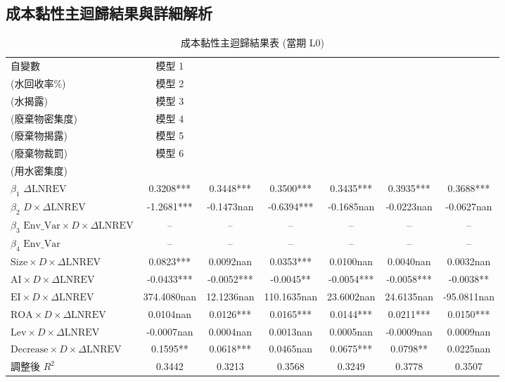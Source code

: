 \documentclass[12pt,a4paper]{article}
\begin{document}
\subsection{成本黏性主迴歸結果與詳細解析}

\begin{table}[H]
\centering
\caption{成本黏性主迴歸結果表 (當期 L0)}
\label{tab:main_reg}
\begin{threeparttable}
\scriptsize
\begin{tabular}{lcccccc}
\toprule
自變數 & 模型 1\\(水回收率\%) & 模型 2\\(水揭露) & 模型 3\\(廢棄物密集度) & 模型 4\\(廢棄物揭露) & 模型 5\\(廢棄物裁罰) & 模型 6\\(用水密集度) \\
\midrule
$\beta_1$ $\Delta\text{LNREV}$ & 0.3208*** & 0.3448*** & 0.3500*** & 0.3435*** & 0.3935*** & 0.3688*** \\
$\beta_2$ $D \times \Delta\text{LNREV}$ & -1.2681*** & -0.1473nan & -0.6394*** & -0.1685nan & -0.0223nan & -0.0627nan \\
$\beta_3$ $\text{Env\_Var} \times D \times \Delta\text{LNREV}$ & -- & -- & -- & -- & -- & -- \\
$\beta_4$ $\text{Env\_Var}$ & -- & -- & -- & -- & -- & -- \\
 $\text{Size} \times D \times \Delta\text{LNREV}$ & 0.0823*** & 0.0092nan & 0.0353*** & 0.0100nan & 0.0040nan & 0.0032nan \\
 $\text{AI} \times D \times \Delta\text{LNREV}$ & -0.0433*** & -0.0052*** & -0.0045** & -0.0054*** & -0.0058*** & -0.0038** \\
 $\text{EI} \times D \times \Delta\text{LNREV}$ & 374.4080nan & 12.1236nan & 110.1635nan & 23.6002nan & 24.6135nan & -95.0811nan \\
 $\text{ROA} \times D \times \Delta\text{LNREV}$ & 0.0104nan & 0.0126*** & 0.0165*** & 0.0144*** & 0.0211*** & 0.0150*** \\
 $\text{Lev} \times D \times \Delta\text{LNREV}$ & -0.0007nan & 0.0004nan & 0.0013nan & 0.0005nan & -0.0009nan & 0.0009nan \\
 $\text{Decrease} \times D \times \Delta\text{LNREV}$ & 0.1595** & 0.0618*** & 0.0465nan & 0.0675*** & 0.0798** & 0.0225nan \\
\midrule
調整後 $R^2$ & 0.3442 & 0.3213 & 0.3568 & 0.3249 & 0.3778 & 0.3507 \\

\end{tabular}
\end{threeparttable}
\end{table}
\end{document}
